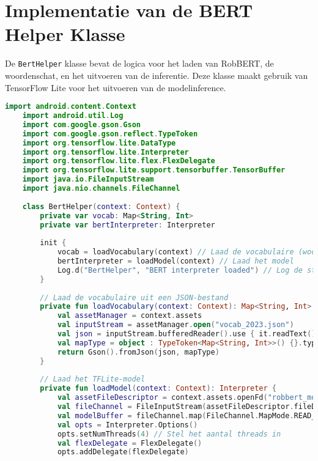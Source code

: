 \section{Implementatie van de BERT Helper Klasse}

De \texttt{BertHelper} klasse bevat de logica voor het laden van RobBERT, de woordenschat, en het uitvoeren van de inferentie. Deze klasse maakt gebruik van TensorFlow Lite voor het uitvoeren van de modelinference.

\begin{lstlisting}[language=Kotlin, caption={Implementatie van BertHelper}]
    import android.content.Context
    import android.util.Log
    import com.google.gson.Gson
    import com.google.gson.reflect.TypeToken
    import org.tensorflow.lite.DataType
    import org.tensorflow.lite.Interpreter
    import org.tensorflow.lite.flex.FlexDelegate
    import org.tensorflow.lite.support.tensorbuffer.TensorBuffer
    import java.io.FileInputStream
    import java.nio.channels.FileChannel
    
    class BertHelper(context: Context) {
        private var vocab: Map<String, Int>
        private var bertInterpreter: Interpreter
        
        init {
            vocab = loadVocabulary(context) // Laad de vocabulaire (woordenlijst)
            bertInterpreter = loadModel(context) // Laad het model
            Log.d("BertHelper", "BERT interpreter loaded") // Log de status
        }
        
        // Laad de vocabulaire uit een JSON-bestand
        private fun loadVocabulary(context: Context): Map<String, Int> {
            val assetManager = context.assets
            val inputStream = assetManager.open("vocab_2023.json")
            val json = inputStream.bufferedReader().use { it.readText() }
            val mapType = object : TypeToken<Map<String, Int>>() {}.type
            return Gson().fromJson(json, mapType)
        }
        
        // Laad het TFLite-model
        private fun loadModel(context: Context): Interpreter {
            val assetFileDescriptor = context.assets.openFd("robbert_model.tflite")
            val fileChannel = FileInputStream(assetFileDescriptor.fileDescriptor).channel
            val modelBuffer = fileChannel.map(FileChannel.MapMode.READ_ONLY, assetFileDescriptor.startOffset, assetFileDescriptor.declaredLength)
            val opts = Interpreter.Options()
            opts.setNumThreads(4) // Stel het aantal threads in
            val flexDelegate = FlexDelegate()
            opts.addDelegate(flexDelegate)
            

\end{lstlisting}
